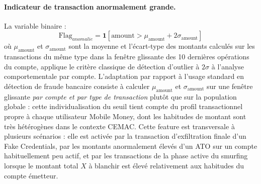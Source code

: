 \documentclass[11pt,a4paper,oneside]{report}
\theoremstyle{definition}
\theoremstyle{remark}
\begin{document}
\paragraph{Indicateur de transaction anormalement grande.}
La variable binaire :
\begin{equation}
    \text{Flag}_{anomalie} = \mathbf{1}\left[\text{amount} > \mu_{\text{amount}} + 2\sigma_{\text{amount}}\right]
\end{equation}
où $\mu_{\text{amount}}$ et $\sigma_{\text{amount}}$ sont la moyenne et l'écart-type des montants calculés sur les transactions du même type dans la fenêtre glissante des 10 dernières opérations du compte, applique le critère classique de détection d'outlier à $2\sigma$ \citep{bolton2002statistical} à l'analyse comportementale par compte. L'adaptation par rapport à l'usage standard en détection de fraude bancaire \citep{bolton2002statistical} consiste à calculer $\mu_{\text{amount}}$ et $\sigma_{\text{amount}}$ sur une fenêtre glissante \emph{par compte et par type de transaction} plutôt que sur la population globale : cette individualisation du seuil tient compte du profil transactionnel propre à chaque utilisateur Mobile Money, dont les habitudes de montant sont très hétérogènes dans le contexte CEMAC. Cette feature est transversale à plusieurs scénarios : elle est activée par la transaction d'exfiltration finale d'un Fake Credentials, par les montants anormalement élevés d'un ATO sur un compte habituellement peu actif, et par les transactions de la phase active du smurfing lorsque le montant total $X$ à blanchir est élevé relativement aux habitudes du compte émetteur.
\end{document}
